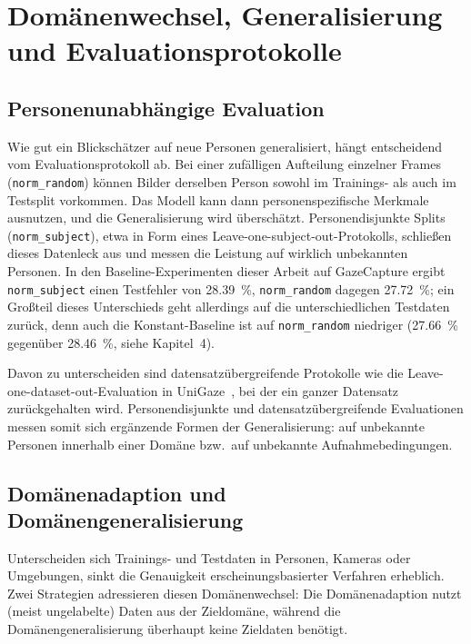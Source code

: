 \documentclass[
  11pt,
  a4paper,
  oneside,
  DIV=12,                 %
  BCOR=8mm,               %
  parskip=half,           %
  headings=normal,
  bibliography=totoc,     %
  listof=totoc            %
]{scrreprt}
\newcommand{\code}[1]{\texttt{#1}}
\begin{document}
\section{Domänenwechsel, Generalisierung und Evaluationsprotokolle}
\label{sec:domain_shift}
\subsection{Personenunabhängige Evaluation}
\label{subsec:norm_subject}
Wie gut ein Blickschätzer auf neue Personen generalisiert, hängt entscheidend vom Evaluationsprotokoll ab. Bei einer zufälligen Aufteilung einzelner Frames (\code{norm\_random}) können Bilder derselben Person sowohl im Trainings- als auch im Testsplit vorkommen. Das Modell kann dann personenspezifische Merkmale ausnutzen, und die Generalisierung wird überschätzt. Personendisjunkte Splits (\code{norm\_subject}), etwa in Form eines Leave-one-subject-out-Protokolls, schließen dieses Datenleck aus und messen die Leistung auf wirklich unbekannten Personen. In den Baseline-Experimenten dieser Arbeit auf GazeCapture ergibt \code{norm\_subject} einen Testfehler von \SI{28,39}{\percent}, \code{norm\_random} dagegen \SI{27,72}{\percent}; ein Großteil dieses Unterschieds geht allerdings auf die unterschiedlichen Testdaten zurück, denn auch die Konstant-Baseline ist auf \code{norm\_random} niedriger (\SI{27,66}{\percent} gegenüber \SI{28,46}{\percent}, siehe Kapitel~4).

Davon zu unterscheiden sind datensatzübergreifende Protokolle wie die Leave-one-dataset-out-Evaluation in UniGaze~\cite{qin2026unigaze}, bei der ein ganzer Datensatz zurückgehalten wird. Personendisjunkte und datensatzübergreifende Evaluationen messen somit sich ergänzende Formen der Generalisierung: auf unbekannte Personen innerhalb einer Domäne bzw.\ auf unbekannte Aufnahmebedingungen.

\subsection{Domänenadaption und Domänengeneralisierung}
\label{subsec:domain_adaptation}
Unterscheiden sich Trainings- und Testdaten in Personen, Kameras oder Umgebungen, sinkt die Genauigkeit erscheinungsbasierter Verfahren erheblich. Zwei Strategien adressieren diesen Domänenwechsel: Die Domänenadaption nutzt (meist ungelabelte) Daten aus der Zieldomäne, während die Domänengeneralisierung überhaupt keine Zieldaten benötigt.
\end{document}
